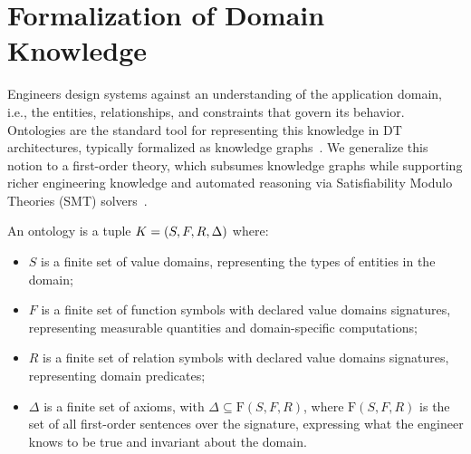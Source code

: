 \section{Formalization of Domain Knowledge}
\label{sec:formalization}



Engineers design systems against an understanding of the application domain, i.e., the entities, relationships, and constraints that govern its behavior. Ontologies are the standard tool for representing this knowledge in DT architectures, typically formalized as knowledge graphs~\cite{Gil2025, KARABULUT2024442, steinmetz2022methodology}. We generalize this notion to a first-order theory, which subsumes knowledge graphs while supporting richer engineering knowledge and automated reasoning via Satisfiability Modulo Theories (SMT) solvers~\cite{Barrett2018}.


\begin{definition}
\label{def:ontology}
An ontology is a tuple $K = (S, F, R, \Delta)$ where:
\begin{itemize}
  \item $S$ is a finite set of {value domains}, representing the types of entities 
        in the domain;
  \item $F$ is a finite set of {function symbols} with declared value domains 
        signatures, representing measurable quantities and domain-specific 
        computations;
  \item $R$ is a finite set of {relation symbols} with declared value domains 
        signatures, representing domain predicates;
  \item $\Delta$ is a finite set of {axioms}, with $\Delta \subseteq \mathrm{F}(S, F, R)$, where $\mathrm{F}(S, F, R)$ is the set of all first-order sentences over the signature, expressing what the engineer knows to be true and invariant about the domain. 
\end{itemize}
\end{definition}

